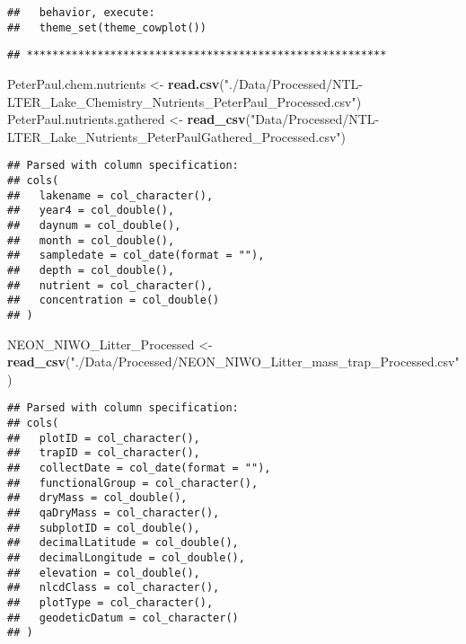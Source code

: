 \documentclass[]{article}
\newenvironment{Shaded}{\begin{snugshade}}{\end{snugshade}}
\newcommand{\KeywordTok}[1]{\textcolor[rgb]{0.13,0.29,0.53}{\textbf{#1}}}
\newcommand{\NormalTok}[1]{#1}
\newcommand{\StringTok}[1]{\textcolor[rgb]{0.31,0.60,0.02}{#1}}
\begin{document}
\begin{verbatim}
##   behavior, execute:
##   theme_set(theme_cowplot())
\end{verbatim}

\begin{verbatim}
## ********************************************************
\end{verbatim}

\begin{Shaded}
\begin{Highlighting}[]
\NormalTok{PeterPaul.chem.nutrients <-}\StringTok{ }
\StringTok{  }\KeywordTok{read.csv}\NormalTok{(}\StringTok{"./Data/Processed/NTL-LTER_Lake_Chemistry_Nutrients_PeterPaul_Processed.csv"}\NormalTok{)}
\NormalTok{PeterPaul.nutrients.gathered <-}
\StringTok{  }\KeywordTok{read_csv}\NormalTok{(}\StringTok{"Data/Processed/NTL-LTER_Lake_Nutrients_PeterPaulGathered_Processed.csv"}\NormalTok{)}
\end{Highlighting}
\end{Shaded}

\begin{verbatim}
## Parsed with column specification:
## cols(
##   lakename = col_character(),
##   year4 = col_double(),
##   daynum = col_double(),
##   month = col_double(),
##   sampledate = col_date(format = ""),
##   depth = col_double(),
##   nutrient = col_character(),
##   concentration = col_double()
## )
\end{verbatim}

\begin{Shaded}
\begin{Highlighting}[]
\NormalTok{NEON_NIWO_Litter_Processed <-}\StringTok{ }\KeywordTok{read_csv}\NormalTok{(}\StringTok{"./Data/Processed/NEON_NIWO_Litter_mass_trap_Processed.csv"}\NormalTok{)}
\end{Highlighting}
\end{Shaded}

\begin{verbatim}
## Parsed with column specification:
## cols(
##   plotID = col_character(),
##   trapID = col_character(),
##   collectDate = col_date(format = ""),
##   functionalGroup = col_character(),
##   dryMass = col_double(),
##   qaDryMass = col_character(),
##   subplotID = col_double(),
##   decimalLatitude = col_double(),
##   decimalLongitude = col_double(),
##   elevation = col_double(),
##   nlcdClass = col_character(),
##   plotType = col_character(),
##   geodeticDatum = col_character()
## )
\end{verbatim}
\end{document}
